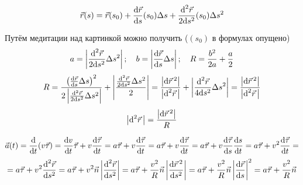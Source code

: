 \[ \vec{r}(s) = \vec{r}(s_0) + \deriv{\vec{r}}{s}(s_0) \Delta s + \frac{\dlta^2 \vec{r}}{2 \dlta s^2}(s_0) \Delta s^2 \]

Путём медитации над картинкой можно получить ($(s_0)$ в формулах опущено)
\[
    a = \abs{\frac{\dlta^2 \vec{r}}{2 \dlta s^2} \Delta s^2}; \quad
    b = \abs{\deriv{\vec{r}}{s} \Delta s}; \quad
    R = \frac{b^2}{2a} + \frac{a}{2}
\]
\[ R = \frac{\left( \deriv{\vec{r}}{s} \Delta s \right)^2}{2 \abs{\frac{\dlta^2 \vec{r}}{2 \dlta s^2} \Delta s^2}} + \abs{\frac{\frac{\dlta^2 \vec{r}}{2 \dlta s^2} \Delta s^2}{2}} = \frac{\abs{\dlta \vec{r}\, ^2}}{\abs{\dlta^2 \vec{r} \,}} + \abs{\frac{\dlta^2 \vec{r}}{4 \dlta s^2} \Delta s^2} = \frac{\abs{\dlta \vec{r}\, ^2}}{\abs{\dlta^2 \vec{r} \,}} \]
\[ \left\lvert \text{d}^2 \vec{r}\, \right\rvert = \frac{\left\lvert \text{d} \vec{r}\, ^2 \right\rvert}{R} \]

\[ \vec{a}(t) =
    \deriv{}{t}( v \vec{\tau} ) =
    \deriv{v}{t} \vec{\tau} + v \deriv{\vec{\tau}}{t} =
    a \vec{\tau} + v \deriv{\vec{\tau}}{t} =
    a \vec{\tau} + v \deriv{\vec{\tau}}{t} =
    a \vec{\tau} + v \deriv{\vec{\tau}}{s} \deriv{s}{t} =
    a \vec{\tau} + v^2 \deriv{\vec{\tau}}{t} =
    \]\[ =
    a \vec{\tau} + v^2 \deriv[2]{\vec{r}}{s} =
    a \vec{\tau} + v^2 \vec{n} \abs{\deriv[2]{\vec{r}}{s}} =
    a \vec{\tau} + \frac{v^2}{R} \vec{n} \abs{\frac{\dlta \vec{r}\, ^2}{\dlta s^2}} = 
    a \vec{\tau} + \frac{v^2}{R} \vec{n} \abs{\deriv{\vec{r}}{s}}^2 = 
    a \vec{\tau} + \frac{v^2}{R} \vec{n}
\]
